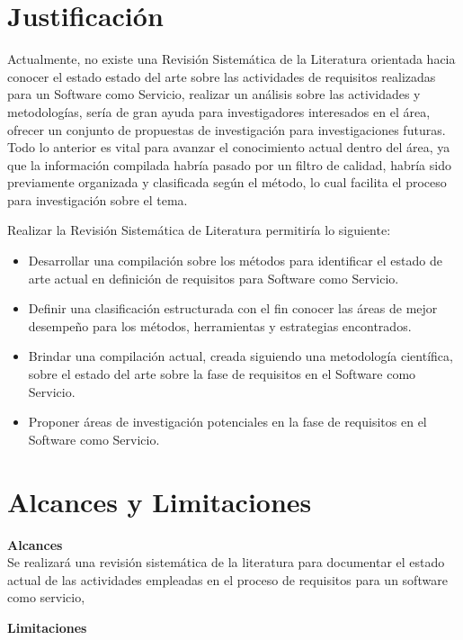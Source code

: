 \documentclass{article}
\begin{document}
\newpage

\section{Justificación}

Actualmente, no existe una Revisión Sistemática de la Literatura orientada hacia conocer el estado estado del arte sobre las actividades de requisitos realizadas para un Software como Servicio, 
realizar un análisis sobre las actividades y metodologías, sería de gran ayuda para investigadores interesados en el área, ofrecer un conjunto de propuestas de investigación para investigaciones futuras. 
Todo lo anterior es vital para avanzar el conocimiento actual dentro del área, ya que la información compilada habría pasado por un filtro de calidad, habría sido previamente organizada y clasificada 
según el método, lo cual facilita el proceso para investigación sobre el tema. 

Realizar la Revisión Sistemática de Literatura permitiría lo siguiente: 

\begin{itemize}
    \item Desarrollar una compilación sobre los métodos para identificar el estado de arte actual en definición de requisitos para Software como Servicio.
    \item Definir una clasificación estructurada con el fin conocer las áreas de mejor desempeño para los métodos, herramientas y estrategias encontrados.
    \item Brindar una compilación actual, creada siguiendo una metodología científica, sobre el estado del arte sobre la fase de requisitos en el Software como Servicio.
    \item Proponer áreas de investigación potenciales en la fase de requisitos en el Software como Servicio.
\end{itemize}
\newpage

\section{Alcances y Limitaciones}
\textbf{Alcances} \\
Se realizará una revisión sistemática de la literatura para documentar el estado actual de las actividades 
empleadas en el proceso de requisitos para un software como servicio, 

\textbf{Limitaciones} \\
\end{document}
